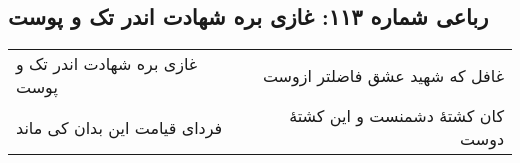 \begin{center}
\section*{رباعی شماره ۱۱۳: غازی بره شهادت اندر تک و پوست}
\label{sec:sh113}
\begin{longtable}{l p{0.5cm} r}
غازی بره شهادت اندر تک و پوست
&&
غافل که شهید عشق فاضلتر ازوست
\\
فردای قیامت این بدان کی ماند
&&
کان کشتهٔ دشمنست و این کشتهٔ دوست
\\
\end{longtable}
\end{center}
